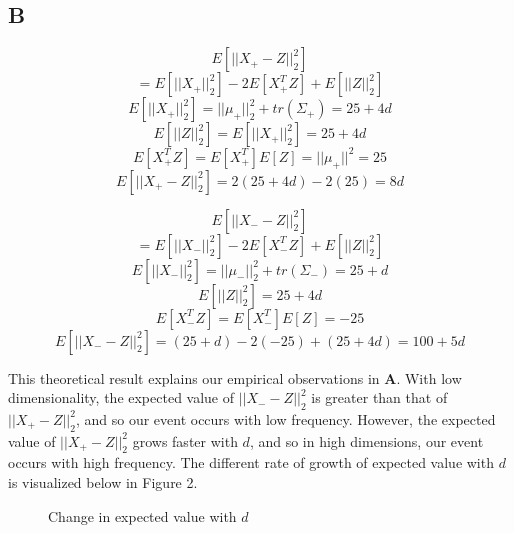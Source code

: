 \documentclass{article}
\begin{document}
\subsection*{B}

$$ E[||X_+ - Z||^2_2] $$
$$ = E[||X_+||_2^2] -2E[X_+^TZ] + E[||Z||^2_2] $$
$$ E[||X_+||^2_2] = ||\mu_+||^2_2 + tr(\Sigma_+) = 25 + 4d$$
$$ E[||Z||^2_2] = E[||X_+||^2_2] = 25 + 4d$$
$$
E[X_+^TZ] = E[X_+^T]E[Z] = ||\mu_+||^2 = 25
$$
$$
E[||X_+ - Z||^2_2] = 2(25+4d) - 2(25) = \boxed{8d}
$$

\medskip

$$ E[||X_- - Z||^2_2] $$
$$ = E[||X_-||_2^2] -2E[X_-^TZ] + E[||Z||^2_2] $$
$$ E[||X_-||^2_2] = ||\mu_-||^2_2 + tr(\Sigma_-) = 25 + d$$
$$ E[||Z||^2_2] = 25 + 4d$$
$$ E[X_-^TZ] = E[X_-^T]E[Z] = -25$$
$$E[||X_- - Z||^2_2] = (25+d) - 2(-25) + (25+4d) = \boxed{100+5d}$$

\medskip

This theoretical result explains our empirical observations in \textbf{A}. With
low dimensionality, the expected value of $||X_{-} - Z||_2^2$ is greater than
that of $||X_+ -Z||^2_2$, and so our event occurs with low frequency.
However, the expected value of $||X_+ -Z||^2_2$ grows faster with $d$, and so in
high dimensions, our event occurs with high frequency. The different rate of
growth of expected value with $d$ is visualized below in Figure 2.

\begin{figure}[h!]
	\centering
	\caption{Change in expected value with $d$}
\end{figure}
\end{document}

